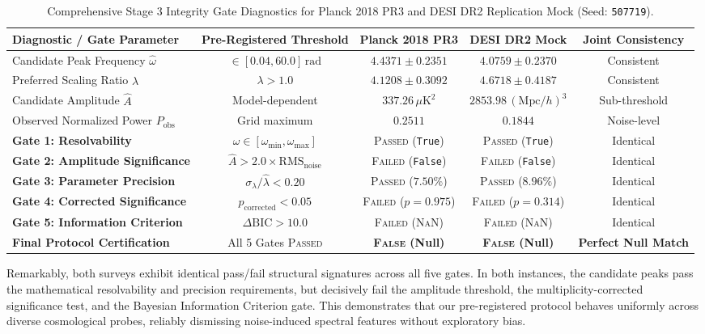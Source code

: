 \documentclass[10pt,twocolumn,a4paper]{article}
\begin{document}
\begin{table}[t]
\centering
\small
\caption{Comprehensive Stage 3 Integrity Gate Diagnostics for Planck 2018 PR3 and DESI DR2 Replication Mock (Seed: \texttt{507719}).}
\label{tab:gates}
\begin{tabular}{lcccc}
\toprule
\textbf{Diagnostic / Gate Parameter} & \textbf{Pre-Registered Threshold} & \textbf{Planck 2018 PR3} & \textbf{DESI DR2 Mock} & \textbf{Joint Consistency} \\
\midrule
Candidate Peak Frequency $\hat\omega$ & $\in [0.04, 60.0]\,\mathrm{rad}$ & $4.4371 \pm 0.2351$ & $4.0759 \pm 0.2370$ & Consistent \\
Preferred Scaling Ratio $\hat\lambda$ & $\lambda > 1.0$ & $4.1208 \pm 0.3092$ & $4.6718 \pm 0.4187$ & Consistent \\
Candidate Amplitude $\hat A$ & Model-dependent & $337.26\,\mu\mathrm{K}^2$ & $2853.98\,(\mathrm{Mpc}/h)^3$ & Sub-threshold \\
Observed Normalized Power $P_{\mathrm{obs}}$ & Grid maximum & $0.2511$ & $0.1844$ & Noise-level \\
\midrule
\textbf{Gate 1: Resolvability} & $\hat\omega \in [\omega_{\min}, \omega_{\max}]$ & \textsc{Passed} (\texttt{True}) & \textsc{Passed} (\texttt{True}) & Identical \\
\textbf{Gate 2: Amplitude Significance} & $\hat A > 2.0 \times \mathrm{RMS}_{\mathrm{noise}}$ & \textsc{Failed} (\texttt{False}) & \textsc{Failed} (\texttt{False}) & Identical \\
\textbf{Gate 3: Parameter Precision} & $\sigma_\lambda / \hat\lambda < 0.20$ & \textsc{Passed} ($7.50\%$) & \textsc{Passed} ($8.96\%$) & Identical \\
\textbf{Gate 4: Corrected Significance} & $p_{\mathrm{corrected}} < 0.05$ & \textsc{Failed} ($p = 0.975$) & \textsc{Failed} ($p = 0.314$) & Identical \\
\textbf{Gate 5: Information Criterion} & $\Delta\mathrm{BIC} > 10.0$ & \textsc{Failed} (\textsc{NaN}) & \textsc{Failed} (\textsc{NaN}) & Identical \\
\midrule
\textbf{Final Protocol Certification} & All 5 Gates \textsc{Passed} & \textbf{\textsc{False} (Null)} & \textbf{\textsc{False} (Null)} & \textbf{Perfect Null Match} \\
\bottomrule
\end{tabular}
\end{table}

Remarkably, both surveys exhibit identical pass/fail structural signatures across all five gates. In both instances, the candidate peaks pass the mathematical resolvability and precision requirements, but decisively fail the amplitude threshold, the multiplicity-corrected significance test, and the Bayesian Information Criterion gate. This demonstrates that our pre-registered protocol behaves uniformly across diverse cosmological probes, reliably dismissing noise-induced spectral features without exploratory bias.
\end{document}
